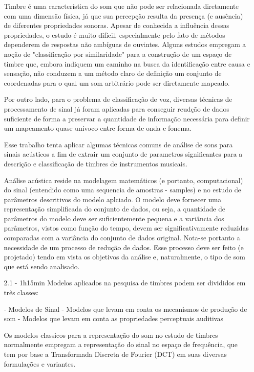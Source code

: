 Timbre é uma característica do som que não pode ser relacionada diretamente
com uma dimensão física, já que sua percepção resulta da presença (e ausência)
de diferentes propriedades sonoras. Apesar de conhecida a influência dessas
propriedades, o estudo é muito difícil, especialmente pelo fato de métodos
dependerem de respostas não ambíguas de ouvintes. Alguns estudos empregam a
noção de "classificação por similaridade" para a construção de um espaço de
timbre que, embora indiquem um caminho na busca da identificação entre causa e
sensação, não conduzem a um método claro de definição um conjunto de
coordenadas para o qual um som arbitrário pode ser diretamente mapeado.

Por outro lado, para o problema de classificação de voz, diversas técnicas de
processamento de sinal já foram aplicadas para conseguir reudção de dados
suficiente de forma a preservar a quantidade de informação necessária para
definir um mapeamento quase unívoco entre forma de onda e fonema.

Esse trabalho tenta aplicar algumas técnicas comuns de análise de sons para
sinais acústicos a fim de extrair um conjunto de parametros significantes para
a descrição e classificação de timbres de instrumentos musicais.

Análise acústica reside na modelagem matemáticos (e portanto, computacional) do
sinal (entendido como uma sequencia de amostras - samples) e no estudo de
parâmetros descritivos do modelo aplciado. O modelo deve fornecer uma
representação simplificada do conjunto de dados, ou seja, a quantidade de
parâmetros do modelo deve ser suficientemente pequena e a variância dos
parâmetros, vistos como função do tempo, devem ser significativamente
reduzidas comparadas com a variância do conjunto de dados original. Nota-se
portanto a necessidade de um processo de redução de dados. Esse processo deve
ser feito (e projetado) tendo em vista os objetivos da análise e,
naturalmente, o tipo de som que está sendo analisado. 

2.1 - 1h15min
Modelos aplicados na pesquisa de timbres podem ser divididos em três classes:

- Modelos de Sinal
- Modelos que levam em conta os mecanismos de produção de som
- Modelos que levam em conta as propriedades perceptuais auditivas

Os modelos classicos para a representação do som no estudo de timbres
normalmente empregam a representação do sinal no espaço de frequência, que tem
por base a Transformada Discreta de Fourier (DCT) em suas diversas formulações
e variantes. 

